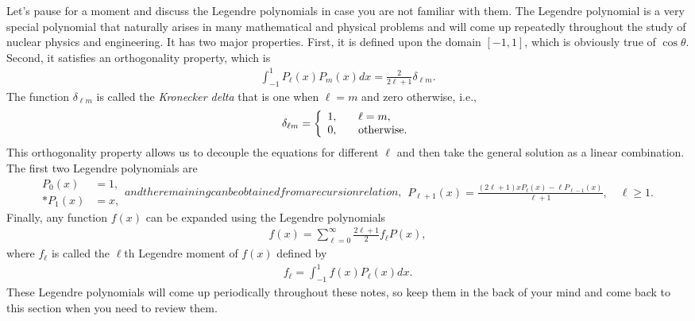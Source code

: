 Let's pause for a moment and discuss the Legendre polynomials in case you are not familiar with them. The Legendre polynomial is a very special polynomial that naturally arises in many mathematical and physical problems and will come up repeatedly throughout the study of nuclear physics and engineering. It has two major properties. First, it is defined upon the domain $[-1,1]$, which is obviously true of $\cos\theta$. Second, it satisfies an orthogonality property, which is
\begin{align} \label{Eq:nuclearData_legendrePolynomialOrthogonality}
  \int_{-1}^1 P_\ell(x) P_m(x) dx = \frac{2}{2 \ell + 1 } \delta_{\ell m}.
\end{align}
The function $\delta_{\ell m}$ is called the \emph{Kronecker delta} that is one when $\ell = m$ and zero otherwise, i.e.,
\begin{align} 
  \delta_{\ell m} = \left\{ \begin{array}{l l}
  1,		& \quad \ell = m, \\
  0,		& \quad \text{otherwise}. \\ \end{array} \right. 
\end{align}
This orthogonality property allows us to decouple the equations for different $\ell$ and then take the general solution as a linear combination. The first two Legendre polynomials are
\begin{subequations}
\begin{align}
  P_0(x) &= 1, \\*
  P_1(x) &= x, 
\end{align}
and the remaining can be obtained from a recursion relation,
\begin{align}
  P_{\ell+1}(x) = \frac{ ( 2\ell + 1 ) x P_\ell(x) - \ell P_{\ell-1}(x) }{ \ell + 1 }, \quad \ell \ge 1.
\end{align}
\end{subequations}
Finally, any function $f(x)$ can be expanded using the Legendre polynomials
\begin{align}
  f(x) = \sum_{\ell=0}^\infty \frac{ 2 \ell + 1 }{ 2 } f_\ell P(x) ,
\end{align}
where $f_\ell$ is called the $\ell$th Legendre moment of $f(x)$ defined by
\begin{align}
  f_\ell = \int_{-1}^1 f(x) P_\ell(x) dx .
\end{align}
These Legendre polynomials will come up periodically throughout these notes, so keep them in the back of your mind and come back to this section when you need to review them.

